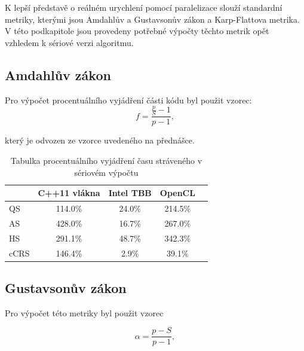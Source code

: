 \documentclass[]{thesiskiv}
\begin{document}
K lepší představě o reálném urychlení pomocí paralelizace slouží standardní metriky, kterými jsou Amdahlův a Gustavsonův zákon a Karp-Flattova metrika. V této podkapitole jsou provedeny potřebné výpočty těchto metrik opět vzhledem k sériové verzi algoritmu.

\subsection{Amdahlův zákon}

Pro výpočet procentuálního vyjádření části kódu byl použit vzorec:
\begin{equation}
	f = \frac{\frac{p}{S}-1}{p-1},
\end{equation}

který je odvozen ze vzorce uvedeného na přednášce.

\begin{table}[ht]
\begin{center}
	\begin{tabular}{ | l | c | c | c | c | }
		\hline
    	~ & C++11 vlákna & Intel TBB & OpenCL \\
		\hline
		\hline
		QS & {\color{Red} 114.0\%} & {\color{OliveGreen} 24.0\%} & {\color{Red} 214.5\%} \\ \hline
		AS & {\color{Red} 428.0\%} & {\color{OliveGreen} 16.7\%} & {\color{Red} 267.0\%} \\ \hline
		HS & {\color{Red} 291.1\%} & {\color{OliveGreen} 48.7\%} & {\color{Red} 342.3\%} \\ \hline
		cCRS & {\color{Red} 146.4\%} & {\color{OliveGreen} 2.9\%} & {\color{OliveGreen} 39.1\%} \\
		\hline
  \end{tabular}
  \caption{Tabulka procentuálního vyjádření času stráveného v sériovém výpočtu}
  \end{center}
\end{table}
\vspace{-1cm}

\subsection{Gustavsonův zákon}

Pro výpočet této metriky byl použit vzorec 

\begin{equation}
	\alpha = \frac{p-S}{p-1},
\end{equation}
\end{document}
